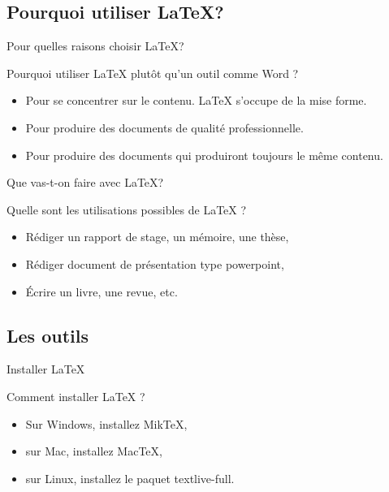 \documentclass{beamer}
\begin{document}
\subsection{Pourquoi utiliser \LaTeX ?}
\begin{frame}{Pour quelles raisons choisir \LaTeX ?}
	\begin{block}{Pourquoi utiliser \LaTeX{} plutôt qu'un outil comme Word ?}
		\begin{itemize}
			\item Pour se concentrer sur le contenu. \LaTeX{} s'occupe de la mise forme.
			\item Pour produire des documents de qualité professionnelle.
			\item Pour produire des documents qui produiront toujours le même contenu.
		\end{itemize}
	\end{block}
\end{frame}

\begin{frame}{Que vas-t-on faire avec \LaTeX ?}
	\begin{block}{Quelle sont les utilisations possibles de \LaTeX{} ?}
		\begin{itemize}
			\item Rédiger un rapport de stage, un mémoire, une thèse,
			\item Rédiger document de présentation type powerpoint,
			\item Écrire un livre, une revue, etc.
		\end{itemize}
	\end{block}
\end{frame}

\subsection{Les outils}
\begin{frame}{Installer \LaTeX}
	\begin{block}{Comment installer \LaTeX{} ?}
		\begin{itemize}
			\item Sur Windows, installez MikTeX,
			\item sur Mac, installez MacTeX,
			\item sur Linux, installez le paquet textlive-full.
		\end{itemize}
	\end{block}
\end{frame}
\end{document}
